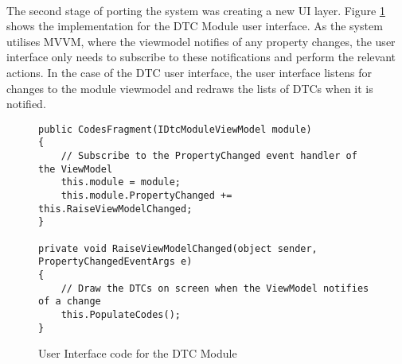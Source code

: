		\paragraph{}{
		The second stage of porting the system was creating a new UI layer. Figure \ref{code:AndroidCodeUI} shows the implementation for the DTC Module user interface. As the system utilises MVVM, where the viewmodel notifies of any property changes, the user interface only needs to subscribe to these notifications and perform the relevant actions. In the case of the DTC user interface, the user interface listens for changes to the module viewmodel and redraws the lists of DTCs when it is notified.
		}
		\begin{figure}[h]
			\begin{lstlisting}
public CodesFragment(IDtcModuleViewModel module)
{
	// Subscribe to the PropertyChanged event handler of the ViewModel
	this.module = module;
	this.module.PropertyChanged += this.RaiseViewModelChanged;
}

private void RaiseViewModelChanged(object sender, PropertyChangedEventArgs e)
{
	// Draw the DTCs on screen when the ViewModel notifies of a change
	this.PopulateCodes();
}			
			\end{lstlisting}
			\caption{User Interface code for the DTC Module}
			\label{code:AndroidCodeUI}
		\end{figure}
					

